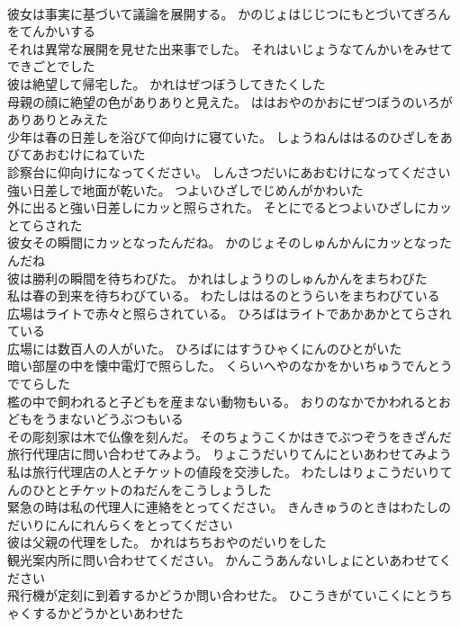 \documentclass[8pt]{extreport}
\begin{document}
\begin{CJK}{UTF8}{min}
\\	彼女は事実に基づいて議論を展開する。	かのじょはじじつにもとづいてぎろんをてんかいする 
\\	それは異常な展開を見せた出来事でした。	それはいじょうなてんかいをみせてできごとでした 
\\	彼は絶望して帰宅した。	かれはぜつぼうしてきたくした 
\\	母親の顔に絶望の色がありありと見えた。	ははおやのかおにぜつぼうのいろがありありとみえた 
\\	少年は春の日差しを浴びて仰向けに寝ていた。	しょうねんははるのひざしをあびてあおむけにねていた 
\\	診察台に仰向けになってください。	しんさつだいにあおむけになってください 
\\	強い日差しで地面が乾いた。	つよいひざしでじめんがかわいた 
\\	外に出ると強い日差しにカッと照らされた。	そとにでるとつよいひざしにカッとてらされた 
\\	彼女その瞬間にカッとなったんだね。	かのじょそのしゅんかんにカッとなったんだね 
\\	彼は勝利の瞬間を待ちわびた。	かれはしょうりのしゅんかんをまちわびた 
\\	私は春の到来を待ちわびている。	わたしははるのとうらいをまちわびている 
\\	広場はライトで赤々と照らされている。	ひろばはライトであかあかとてらされている 
\\	広場には数百人の人がいた。	ひろばにはすうひゃくにんのひとがいた 
\\	暗い部屋の中を懐中電灯で照らした。	くらいへやのなかをかいちゅうでんとうでてらした 
\\	檻の中で飼われると子どもを産まない動物もいる。	おりのなかでかわれるとおどもをうまないどうぶつもいる 
\\	その彫刻家は木で仏像を刻んだ。	そのちょうこくかはきでぶつぞうをきざんだ 
\\	旅行代理店に問い合わせてみよう。	りょこうだいりてんにといあわせてみよう 
\\	私は旅行代理店の人とチケットの値段を交渉した。	わたしはりょこうだいりてんのひととチケットのねだんをこうしょうした 
\\	緊急の時は私の代理人に連絡をとってください。	きんきゅうのときはわたしのだいりにんにれんらくをとってください 
\\	彼は父親の代理をした。	かれはちちおやのだいりをした 
\\	観光案内所に問い合わせてください。	かんこうあんないしょにといあわせてください 
\\	飛行機が定刻に到着するかどうか問い合わせた。	ひこうきがていこくにとうちゃくするかどうかといあわせた 

\end{CJK}
\end{document}
